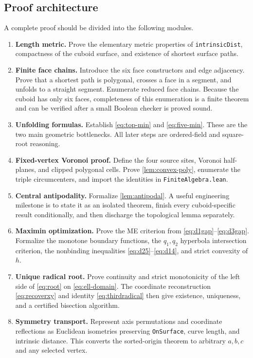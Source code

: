 \documentclass[11pt]{article}
\theoremstyle{definition}
\begin{document}
\subsection{Proof architecture}

A complete proof should be divided into the following modules.

\begin{enumerate}[leftmargin=2.2em]
\item \textbf{Length metric.}  Prove the elementary metric properties of
\texttt{intrinsicDist}, compactness of the cuboid surface, and existence of
shortest surface paths.

\item \textbf{Finite face chains.}  Introduce the six face constructors and
edge adjacency.  Prove that a shortest path is polygonal, crosses a face in a
segment, and unfolds to a straight segment.  Enumerate reduced face chains.
Because the cuboid has only six faces, completeness of this enumeration is a
finite theorem and can be verified after a small Boolean checker is proved
sound.

\item \textbf{Unfolding formulas.}  Establish \eqref{eq:top-min} and
\eqref{eq:five-min}.  These are the two main geometric bottlenecks.  All later
steps are ordered-field and square-root reasoning.

\item \textbf{Fixed-vertex Voronoi proof.}  Define the four source sites,
Voronoi half-planes, and clipped polygonal cells.  Prove
\cref{lem:convex-poly}, enumerate the triple circumcenters, and import the
identities in \texttt{FiniteAlgebra.lean}.

\item \textbf{Central antipodality.}  Formalize \cref{lem:antipodal}.  A useful
engineering milestone is to state it as an isolated theorem, finish every
cuboid-specific result conditionally, and then discharge the topological
lemma separately.

\item \textbf{Maximin optimization.}  Prove the ME criterion from
\eqref{eq:d1gap}--\eqref{eq:d3gap}.  Formalize the monotone boundary functions,
the $q_1,q_2$ hyperbola intersection criterion, the nonbinding inequalities
\eqref{eq:d25}--\eqref{eq:d14}, and strict convexity of $h$.

\item \textbf{Unique radical root.}  Prove continuity and strict monotonicity
of the left side of \eqref{eq:root} on \eqref{eq:ell-domain}.  The coordinate
reconstruction \eqref{eq:recoverxy} and identity \eqref{eq:thirdradical} then
give existence, uniqueness, and a certified bisection algorithm.

\item \textbf{Symmetry transport.}  Represent axis permutations and coordinate
reflections as Euclidean isometries preserving \texttt{OnSurface}, curve
length, and intrinsic distance.  This converts the sorted-origin theorem to
arbitrary $a,b,c$ and any selected vertex.
\end{enumerate}
\end{document}
